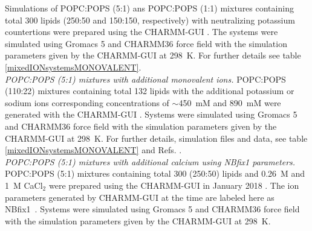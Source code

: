 \documentclass[journal=jpcbfk,manuscript=article]{achemso}
\newcommand{\todo}[1]{\textcolor{red}{#1}}
\begin{document}

Simulations of POPC:POPS (5:1) ans POPC:POPS (1:1) mixtures containing total 300 lipids (250:50 and 150:150, respectively)
with neutralizing potassium countertions 
were prepared
using the CHARMM-GUI \cite{lee16,jo18}. The systems were simulated using Gromacs 5 \cite{abraham2015gromacs}
and CHARMM36 force field with the simulation parameters given by the CHARMM-GUI at 298~K. For further details see table \ref{mixedIONsystemsMONOVALENT}. 
 \\

\noindent
{\it POPC:POPS (5:1) mixtures with additional monovalent ions.}
POPC:POPS (110:22) mixtures containing total 132 lipids with the additional
potassium or sodium ions corresponding concentrations of $\sim$450~mM and 890~mM
were generated with the CHARMM-GUI \cite{lee16,jo18}. Systems were simulated using
Gromacs 5 \cite{abraham2015gromacs} and CHARMM36 force field with the simulation
parameters given by the CHARMM-GUI at 298~K. For further details, simulation files
and data, see table \ref{mixedIONsystemsMONOVALENT} and
Refs. . \\


\noindent
{\it POPC:POPS (5:1) mixtures with additional calcium using NBfix1 parameters.} 
POPC:POPS (5:1) mixtures containing total 300 (250:50) lipids
and 0.26~M and 1~M CaCl$_2$ were prepared using the CHARMM-GUI in January 2018 \cite{lee16,jo18}.
The ion parameters generated by CHARMM-GUI at the time are labeled here as NBfix1~\cite{kim16}.
Systems were simulated using Gromacs 5 \cite{abraham2015gromacs} and CHARMM36 force field with the simulation parameters given
by the CHARMM-GUI at 298~K. \\
\end{document}
